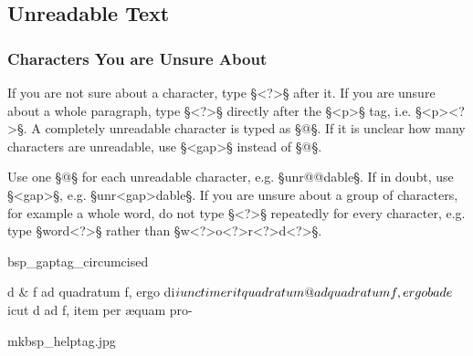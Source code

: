 \tocspace
\subsection{Unreadable Text}
\label{section unreadable text}

\subsubsection{Characters You are Unsure About}
\label{section characters you are unsure about}

\begin{mainrule}
If you are not sure about a character, type §<?>§ after it. If you are unsure about a whole paragraph, type §<?>§ directly after the §<p>§ tag, i.e. §<p><?>§. A completely unreadable character is typed as §@§. If it is unclear how many characters are unreadable, use §<gap>§ instead of §@§.
\end{mainrule}

\begin{clarification}
Use one §@§ for each unreadable character, e.g. §unr@@dable§. If in doubt, use §<gap>§, e.g. §unr<gap>dable§. If you are unsure about a group of characters, for example a whole word, do not type §<?>§ repeatedly for every character, e.g. type §word<?>§ rather than §w<?>o<?>r<?>d<?>§.
\end{clarification}

\vspace{2mm}
\begin{sampleImage}[1: \, a stain]{bsp_gaptag_circumcised} 
\begin{typeLatin}
d & f ad quadratum f, ergo di$iunctim erit quadratum \bold{@} ad\\
quadratum f, ergo b ad e $icut d ad f, item per æquam pro-\\ 
\end{typeLatin}

\end{sampleImage}

\begin{sampleImage}{mkbsp_helptag.jpg}

\end{sampleImage}


